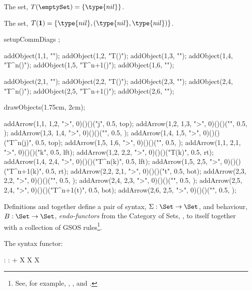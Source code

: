 \item The set, $T(\emptySet) = \{ \type{nil} \}$.

\item The set, $T(\bold{1}) = \{ \type{nil}, (\type{nil}, \type{nil}) \}$. 

\stopitemize

\placeformula[+]\startformula {}
  setupCommDiags ; 
  
  addObject(1,1, "\emptySet");
  addObject(1,2, "T(\emptySet)");
  addObject(1,3, "\cdots");
  addObject(1,4, "T^n(\emptySet)");
  addObject(1,5, "T^{n+1}(\emptySet)");
  addObject(1,6, "\cdots");
  
  addObject(2,1, "");
  addObject(2,2, "T()");
  addObject(2,3, "\cdots");
  addObject(2,4, "T^n()");
  addObject(2,5, "T^{n+1}()");
  addObject(2,6, "\cdots");

  drawObjects(1.75cm, 2cm);

  addArrow(1,1, 1,2, ">", 0)()()("j",          0.5, top);
  addArrow(1,2, 1,3, ">", 0)()()("",           0.5, );
  addArrow(1,3, 1,4, ">", 0)()()("",           0.5, );
  addArrow(1,4, 1,5, ">", 0)()()("\vphantom\lgroup T^n(j)",     0.5, top);
  addArrow(1,5, 1,6, ">", 0)()()("",           0.5, );
  addArrow(1,1, 2,1, ">", 0)()()("k",          0.5, lft);
  addArrow(1,2, 2,2, ">", 0)()()("T(k)",       0.5, rt);
  addArrow(1,4, 2,4, ">", 0)()()("T^n(k)", 0.5, lft);
  addArrow(1,5, 2,5, ">", 0)()()("T^{n+1}(k)", 0.5, rt);
  addArrow(2,2, 2,1, ">", 0)()()("t",          0.5, bot);
  addArrow(2,3, 2,2, ">", 0)()()("",           0.5, );
  addArrow(2,4, 2,3, ">", 0)()()("",           0.5, );
  addArrow(2,5, 2,4, ">", 0)()()("\vphantom\lgroup T^{n+1}(t)", 0.5, bot);
  addArrow(2,6, 2,5, ">", 0)()()("",           0.5, );

\stopMPcode \stopformula

\stopMMundi

\startMMundi

Definitions \in[beastieActions] and \in[beastieTests] together define a 
pair of syntax, $\Sigma : \Set \rightarrow \Set$, and behaviour, $B : \Set 
\rightarrow \Set$, \emph{endo-functors} from the Category of Sets, \Set, 
to itself together with a collection of GSOS rules\footnote{See, for 
example, \cite{turiPlotkin1997operationalSemantics}, 
\cite{klin2011bialgebrasSOS}, and \cite{jacobs2017coalgebras}.}. 

The syntax functor: 

\placeformula[+]\startformula\startalign
  \NC \Sigma : \NC \Set \rightarrow \Set           \NR
  \NC \Sigma : \NC {} + X \times X \mapsto X \NR
\stopalign\stopformula

